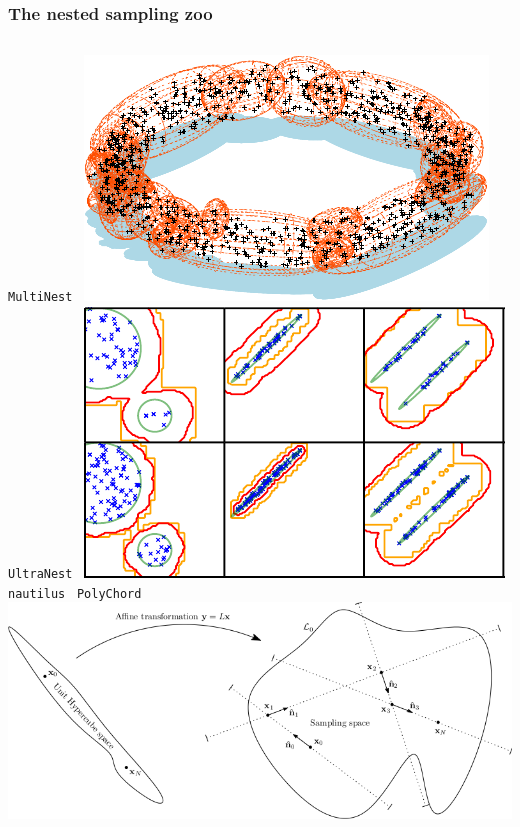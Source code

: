 \documentclass[aspectratio=169,handout]{beamer}
\begin{document}
\begin{frame}
    \frametitle{The nested sampling zoo \hspace{170pt} }
    \begin{columns}[t]
        \texttt{MultiNest}~
        \includegraphics[width=\textwidth]{figures/multinest}
        \texttt{UltraNest}~
        \includegraphics[width=\textwidth]{figures/radfriends}
        \texttt{nautilus}~ 
        \texttt{PolyChord}~
        \includegraphics[width=\textwidth]{figures/polychord}

\end{columns}
\end{frame}
\end{document}
